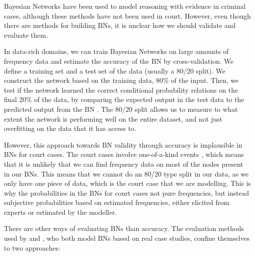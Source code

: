 \documentclass[12pt]{article}
\begin{document}
Bayesian Networks have been used to model reasoning with evidence in criminal cases, although these methods have not been used in court. However, even though there are methods for building BNs, it is unclear how we should validate and evaluate them. 

In data-rich domains, we can train Bayesian Networks on large amounts of frequency data and estimate the accuracy of the BN by cross-validation. We define a training set and a test set of the data (usually a 80/20 split). We construct the network based on the training data, 80\% of the input. Then, we test if the network learned the correct conditional probability relations on the final 20\% of the data, by comparing the expected output in the test data to the predicted output from the BN \citep{chen2012}. The 80/20 split allows us to measure to what extent the network is performing well on the entire dataset, and not just overfitting on the data that it has access to.

However, this approach towards BN validity through accuracy is implausible in BNs for court cases. The court cases involve one-of-a-kind events \citep{schum1982}, which means that it is unlikely that we can find frequency data on most of the nodes present in our BNs. This means that we cannot do an 80/20 type split in our data, as we only have one piece of data, which is the court case that we are modelling. This is why the probabilities in the BNs for court cases not pure frequencies, but instead subjective probabilities based on estimated frequencies, either elicited from experts or estimated by the modeller.

There are other ways of evaluating BNs than accuracy. The evaluation methods used by \citet{Fenton2019} and \citet{vlek2016}, who both model BNs based on real case studies, confine themselves to two approaches:
\end{document}

